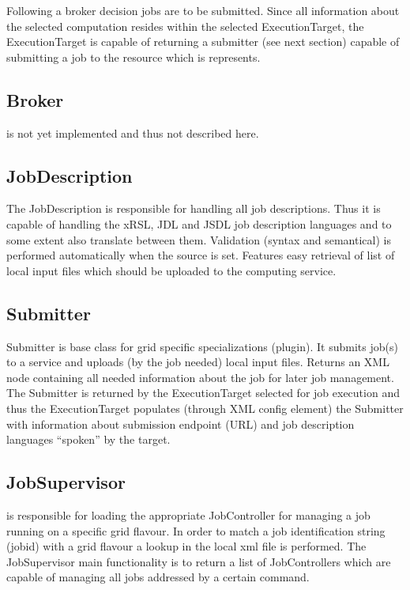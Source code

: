 \documentclass{book}
\begin{document}
Following a broker decision jobs are to be submitted. Since all information about the selected computation resides within the 
selected ExecutionTarget, the ExecutionTarget is capable of returning a submitter (see next section) capable of submitting a 
job to the resource which is represents.

\subsection{Broker} is not yet implemented and thus not described here.

\subsection{JobDescription} The JobDescription is responsible for handling all job descriptions. Thus it is capable of handling the xRSL, JDL and 
JSDL job description languages and to some extent also translate between them. Validation (syntax and semantical) is performed 
automatically when the source is set. Features easy retrieval of list of local input files which should be uploaded to the 
computing service.

\subsection{Submitter} Submitter is base class for grid specific specializations (plugin).  It submits job(s) to a service and 
uploads (by the job needed) local input files. Returns an XML node containing all needed information about the job 
for later job management. The Submitter is returned by the ExecutionTarget selected for job execution and thus the 
ExecutionTarget populates (through XML config element) the Submitter with information about submission endpoint (URL) 
and job description languages ``spoken'' by the target.

\subsection{JobSupervisor} is responsible for loading the appropriate JobController for managing a job running on a specific 
grid flavour. In order to match a job identification string (jobid) with a grid flavour a lookup in the local xml file is 
performed. The JobSupervisor main functionality is to return a list of JobControllers which are capable of managing all jobs 
addressed by a certain command.
\end{document}
